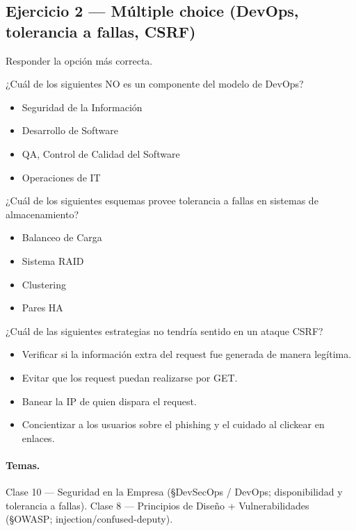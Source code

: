 \subsection{Ejercicio 2 — Múltiple choice (DevOps, tolerancia a fallas, CSRF)}

\begin{consigna}
Responder la opción más correcta.

\medskip\noindent ¿Cuál de los siguientes NO es un componente del modelo de DevOps?
\begin{itemize}
  \item Seguridad de la Información
  \item Desarrollo de Software
  \item QA, Control de Calidad del Software
  \item Operaciones de IT
\end{itemize}

\medskip\noindent ¿Cuál de los siguientes esquemas provee tolerancia a fallas en sistemas de almacenamiento?
\begin{itemize}
  \item Balanceo de Carga
  \item Sistema RAID
  \item Clustering
  \item Pares HA
\end{itemize}

\medskip\noindent ¿Cuál de las siguientes estrategias no tendría sentido en un ataque CSRF?
\begin{itemize}
  \item Verificar si la información extra del request fue generada de manera legítima.
  \item Evitar que los request puedan realizarse por GET.
  \item Banear la IP de quien dispara el request.
  \item Concientizar a los usuarios sobre el phishing y el cuidado al clickear en enlaces.
\end{itemize}
\end{consigna}

\paragraph{Temas.}
Clase 10 — Seguridad en la Empresa (\S DevSecOps / DevOps; disponibilidad y tolerancia a fallas). Clase 8 — Principios de Diseño + Vulnerabilidades (\S OWASP; injection/confused-deputy).

